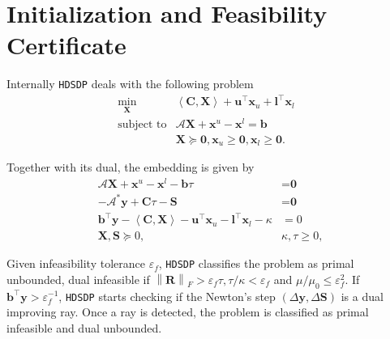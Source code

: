 \section{Initialization and Feasibility Certificate} \label{sec4}

Internally {{\texttt{HDSDP}}} deals with the following problem
\begin{eqnarray*}
  \min_{\mathbf{X}} & \left\langle \mathbf{C}, \mathbf{X} \right\rangle + \mathbf{u}^{\top} \mathbf{x}_u +
  \mathbf{l}^{\top} \mathbf{x}_l & \\
  \text{subject to} & \mathcal{A} \mathbf{X} + \mathbf{x}^u - \mathbf{x}^l = \mathbf{b} & \\
  & \mathbf{X} \succeq \textbf{0}, \mathbf{x}_u \geq \textbf{0}, \mathbf{x}_l \geq \textbf{0}. & 
\end{eqnarray*}

Together with its dual, the embedding is given by
\begin{align*}
  \mathcal{A} \mathbf{X} + \mathbf{x}^u - \mathbf{x}^l - \mathbf{b} \tau & = \textbf{0}\\
  - \mathcal{A}^{\ast} \mathbf{y} + \mathbf{C} \tau - \mathbf{S} & = \textbf{0}\\
  \mathbf{b}^{\top} \mathbf{y} - \left\langle \mathbf{C}, \mathbf{X} \right\rangle - \mathbf{u}^{\top} \mathbf{x}_u -
  \mathbf{l}^{\top} \mathbf{x}_l - \kappa & = 0\\
  \mathbf{X}, \mathbf{S} \succeq 0, &  \kappa, \tau \geq 0,
\end{align*}

 Given infeasibility tolerance $\varepsilon_f$, {{\texttt{HDSDP}}} classifies the problem as primal unbounded, dual infeasible if $\left\| \mathbf{R}
\right\|_F > \varepsilon_f \tau, \tau / \kappa < \varepsilon_f$ and $\mu /
\mu_0 \leq \varepsilon_f^2$. If $\mathbf{b}^{\top} \mathbf{y} >
\varepsilon_f^{- 1}$, {{\texttt{HDSDP}}} starts checking if the Newton's
step $( \Delta \mathbf{y}, \Delta \mathbf{S} )$ is a dual improving ray. Once a ray is detected, the problem is classified as primal
infeasible and dual unbounded.
